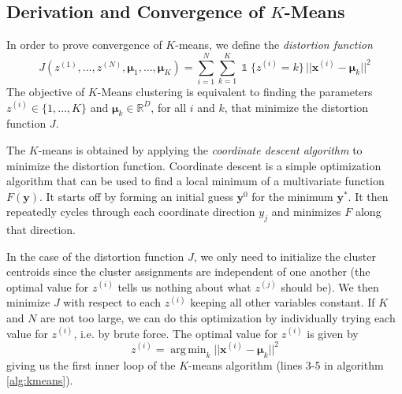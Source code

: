 \documentclass[final,3p,times,twocolumn]{elsarticle}
\DeclareMathOperator*{\argmin}{arg\,min}
\let\bs\boldsymbol
\DeclareMathOperator*{\id}{\mathds{1}}
\begin{document}
\subsection{Derivation and Convergence of $K$-Means}
\label{sect:kmeans-derivation}
In order to prove convergence of $K$-means, we define the \emph{distortion function} 
\begin{equation}
\label{eqn:distortion}
J(z^{(1)},\dots,z^{(N)},\bs\mu_1,\dots,\bs\mu_K) = \sum_{i=1}^N \sum_{k=1}^K \id\{z^{(i)}=k\}\,||\bs x^{(i)} - \bs \mu_k||^2
\end{equation}
The objective of $K$-Means clustering is equivalent to finding the parameters $z^{(i)} \in \{1,\dots,K\}$ and $\bs\mu_k\in\mathbb{R}^D$, for all $i$ and $k$, that minimize the distortion function $J$.

The $K$-means is obtained by applying the \emph{coordinate descent algorithm} to minimize the distortion function.
Coordinate descent is a simple optimization algorithm that can be used to find a local minimum of a multivariate function $F(\bs y)$.
It starts off by forming an initial guess $\bs y^{0}$ for the minimum $\bs y^*$. 
It then repeatedly cycles through each coordinate direction $y_j$ and minimizes $F$ along that direction.

In the case of the distortion function $J$, we only need to initialize the cluster centroids since the cluster assignments are independent of one another (the optimal value for $z^{(i)}$ tells us nothing about what $z^{(j)}$ should be).
We then minimize $J$ with respect to each $z^{(i)}$ keeping all other variables constant. 
If $K$ and $N$ are not too large, we can do this optimization by individually trying each value for $z^{(i)}$, i.e. by brute force.
The optimal value for $z^{(i)}$ is given by
\begin{equation}
\label{eqn:kmeans-E}
z^{(i)} = \argmin_k ||\bs x^{(i)} - \bs\mu_k||^2
\end{equation}
giving us the first inner loop of the $K$-means algorithm (lines 3-5 in algorithm \ref{alg:kmeans}).
\end{document}
